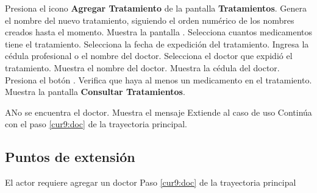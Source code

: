 \begin{UCtrayectoria}
 	
 	\UCpaso [\UCactor] Presiona el icono \textbf{Agregar Tratamiento} de la pantalla \textbf{Tratamientos}.
 	\UCpaso Genera el nombre del nuevo tratamiento, siguiendo el orden numérico de los nombres creados hasta el momento.
 	\UCpaso Muestra la pantalla .
 	\UCpaso [\UCactor] Selecciona cuantos medicamentos tiene el tratamiento.
 	\UCpaso [\UCactor] Selecciona la fecha de expedición del tratamiento.
 	\UCpaso [\UCactor] Ingresa la cédula profesional o el nombre del doctor.
 	\UCpaso [\UCactor] Selecciona el doctor que expidió el tratamiento.
 	\UCpaso Muestra el nombre del doctor.
 	\UCpaso Muestra la cédula del doctor.
 	\UCpaso [\UCactor] Presiona el botón . \label{cur9:doc}
 	\UCpaso Verifica que haya al menos un medicamento en el tratamiento.
 	\UCpaso Muestra la pantalla \textbf{Consultar Tratamientos}.
 	
 	
    
 \end{UCtrayectoria}

\begin{UCtrayectoriaA}{A}{No se encuentra el doctor.}
	\UCpaso Muestra el mensaje 
	\UCpaso Extiende al caso de uso  
	\UCpaso Continúa con el paso \ref{cur9:doc} de la trayectoria principal.
\end{UCtrayectoriaA} 
 



 
\subsection{Puntos de extensión}

\UCExtensionPoint
{El actor requiere agregar un doctor}
{ Paso \ref{cur9:doc} de la trayectoria principal}
{}



